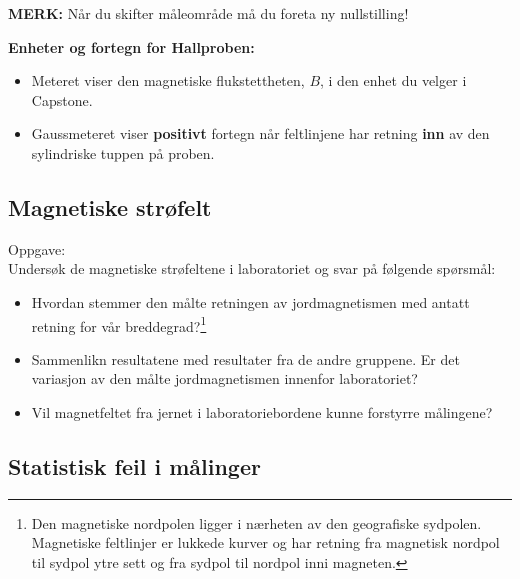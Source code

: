 \documentclass[../Elmag-labhefte-2020.tex]{subfiles}
\begin{document}
\textbf{MERK:} Når du skifter måleområde må du foreta ny nullstilling!

\textbf{Enheter og fortegn for Hallproben:}
\vspace{-5mm}
\begin{itemize}
    \item Meteret viser den magnetiske flukstettheten, $B$, i den enhet du velger i Capstone.
    \item Gaussmeteret viser \textbf{positivt} fortegn når feltlinjene har retning \textbf{inn} av den sylindriske tuppen på proben.
\end{itemize}

\subsection{Magnetiske strøfelt}

Oppgave:\\
{\itsf Undersøk de magnetiske strøfeltene i laboratoriet og svar på følgende spørsmål:}
\vspace{-5mm}
\begin{itemize}
    \item Hvordan stemmer den målte retningen av jordmagnetismen med antatt retning for vår breddegrad?\footnote{Den magnetiske nordpolen ligger i nærheten av den geografiske sydpolen. Magnetiske feltlinjer er lukkede kurver og har retning fra magnetisk nordpol til sydpol ytre sett og fra sydpol til nordpol inni magneten.}
    \item Sammenlikn resultatene med resultater fra de andre gruppene. Er det variasjon av den målte jordmagnetismen innenfor laboratoriet?
    \item Vil magnetfeltet fra jernet i laboratoriebordene kunne forstyrre målingene?
\end{itemize}



\subsection{Statistisk feil i målinger}
\end{document}
